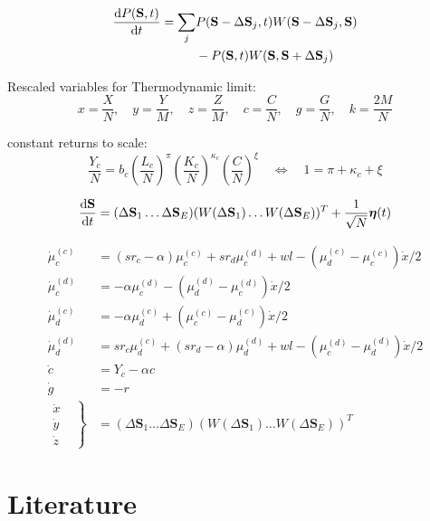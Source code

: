 \begin{align}
	\frac{{\rm d} P(\mathbf{S}, t)}{{\rm d} t} = \sum_{j} &P(\mathbf{S} - \Delta \mathbf{S}_j, t) W(\mathbf{S} - \Delta \mathbf{S}_j,\mathbf{S}) \nonumber \\
	&- P(\mathbf{S}, t) W(\mathbf{S},\mathbf{S} + \Delta \mathbf{S}_j) \nonumber
\end{align}

Rescaled variables for Thermodynamic limit:
\begin{equation}
	x = \frac{X}{N}, \quad y = \frac{Y}{M}, \quad z = \frac{Z}{M}, \quad c = \frac{C}{N}, \quad g = \frac{G}{N}, \quad k = \frac{2M}{N}
\end{equation}

constant returns to scale:
\begin{equation}
	\frac{Y_c}{N} = b_c\left( \frac{L_c}{N} \right)^{\pi}\left( \frac{K_c}{N} \right)^{\kappa_c}\left( \frac{C}{N} \right)^{\xi} \quad \Leftrightarrow \quad 1 = \pi + \kappa_c + \xi
\end{equation}

\begin{equation}
	\frac{{\rm d} \mathbf{S} }{{\rm d} t} = (\Delta \mathbf{S}_1 \dots \Delta \mathbf{S}_E) (W(\Delta \mathbf{S}_1) \dots  W(\Delta \mathbf{S}_E))^{T} + \frac{1}{\sqrt{N}} \boldsymbol{\eta}(t)
\end{equation}

\begin{align}
	\dot{\mu}_c^{(c)} &= (sr_c - \alpha)\mu_c^{(c)} + s r_d \mu_c^{(d)} + w l - (\mu_d^{(c)} - \mu_c^{(c)})\dot{x}/2 \nonumber \\
	\dot{\mu}_c^{(d)} &= - \alpha\mu_c^{(d)} - (\mu_d^{(d)} - \mu_c^{(d)})\dot{x}/2\nonumber \\
	\dot{\mu}_d^{(c)} &= - \alpha\mu_d^{(c)} + (\mu_c^{(c)} - \mu_d^{(c)})\dot{x}/2\nonumber \\
	\dot{\mu}_d^{(d)} &= sr_c \mu_d^{(c)} + (s r_d - \alpha)\mu_d^{(d)} + w l - (\mu_c^{(d)} - \mu_d^{(d)})\dot{x}/2\nonumber \\
	\dot{c} &= Y_c - \alpha c\nonumber \\
	\dot{g} &= -r \nonumber \\
	\left. \begin{aligned} 
		\dot{x} & \\
		\dot{y} & \\
		\dot{z} & 
	\end{aligned} \right\} &=(\Delta \mathbf{S}_1 \dots \Delta \mathbf{S}_E) (W(\Delta \mathbf{S}_1) \dots  W(\Delta \mathbf{S}_E))^{T}
\end{align}

\section{Literature}

{}
    

